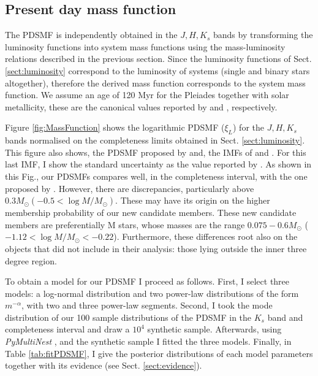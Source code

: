 \subsection{Present day mass function}

The PDSMF is independently obtained in the $J,H,K_s$ bands by transforming the luminosity functions into system mass functions using the mass-luminosity relations described in the previous section. Since the luminosity functions of Sect. \ref{sect:luminosity} correspond to the luminosity of systems (single and binary stars altogether), therefore the derived mass function corresponds to the system mass function. We assume an age of 120 Myr for the Pleiades together with solar metallicity, these are the canonical values reported by \citet{} and \citet{}, respectively.

Figure \ref{fig:MassFunction} shows the logarithmic PDSMF ($\xi_L$) for the $J,H,K_s$ bands normalised on the completeness limits obtained in Sect. \ref{sect:luminosity}. This figure also shows, the PDSMF proposed by  \citet{Bouy2015} and, the IMFs of \citet{Thies2007} and \citet{Chabrier2005}. For this last IMF, I show the standard uncertainty as the value reported by \citet{Chabrier2003}. As shown in this Fig., our PDSMFs compares well, in the completeness interval, with the one proposed by \citet{Bouy2015}. However, there are discrepancies, particularly above $0.3 M_{\odot} (-0.5 < \log M/M_{\odot})$. These may have its origin on the higher membership probability of our new candidate members. These new candidate members are preferentially M stars, whose masses are the range $0.075 - 0.6 M_{\odot}$ ($-1.12 < \log M/M_{\odot} < -0.22$). Furthermore, these differences root also on the objects that \citet{Bouy2015} did not include in their analysis: those lying outside the inner three degree region. 

To obtain a  model for our PDSMF I proceed as follows. First, I select three models: a log-normal distribution and two power-law distributions of the form $m^{-\alpha}$, with two and three power-law segments. Second, I took the mode distribution of our 100 sample distributions of the PDSMF in the $K_s$ band and completeness interval and draw a $10^4$ synthetic sample. Afterwards, using \emph{PyMultiNest} \citep{Buchner2014}, and the synthetic sample I fitted the three models. Finally, in Table \ref{tab:fitPDSMF}, I give the posterior distributions of each model parameters together with its evidence (see Sect. \ref{sect:evidence}).

